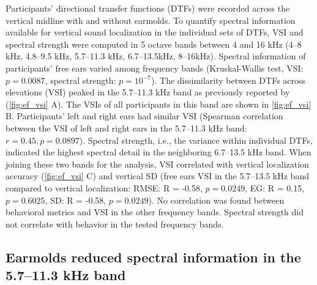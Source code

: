 Participants' directional transfer functions (DTFs) were recorded across the vertical midline with and without earmolds. To quantify spectral information available for vertical sound localization in the individual sets of DTFs, VSI \citep{trapeau_fast_2016} and spectral strength \citep{andeol_sound_2013} were computed in 5 octave bands between 4 and 16 kHz (4–8 kHz, 4.8–9.5 kHz, 5.7–11.3 kHz, 6.7–13.5kHz, 8–16kHz). Spectral information of participants’ free ears varied among frequency bands (Kruskal-Wallis test, VSI: $p = 0.0087$, spectral strength: $p = 10^{-7}$). The dissimilarity between DTFs across elevations (VSI) peaked in the 5.7–11.3 kHz band as previously reported by \citet{trapeau_fast_2016} (\cref{fig:ef_vsi} A). The VSIs of all participants in this band are shown in \cref{fig:ef_vsi} B. Participants' left and right ears had similar VSI (Spearman correlation between the VSI of left and right ears in the 5.7–11.3 kHz band: $r = 0.45, p = 0.0897$). Spectral strength, i.e., the variance within individual DTFs, indicated the highest spectral detail in the neighboring 6.7–13.5 kHz band. When joining these two bands for the analysis, VSI correlated with vertical localization accuracy (\cref{fig:ef_vsi} C) and vertical SD (free ears VSI in the 5.7–13.5 kHz band compared to vertical localization: RMSE: R = -0.58, $p = 0.0249$, EG: R = 0.15, $p = 0.6025$, SD: R = -0.58, $p = 0.0249$). No correlation was found between behavioral metrics and VSI in the other frequency bands. Spectral strength did not correlate with behavior in the tested frequency bands.

\subsection{Earmolds reduced spectral information in the 5.7–11.3 kHz band}

